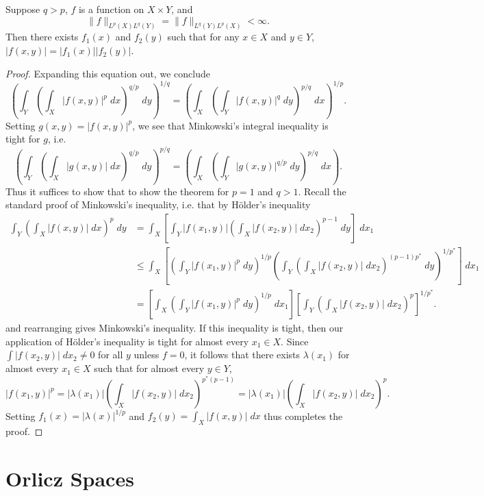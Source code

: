 \begin{theorem}
  Suppose $q > p$, $f$ is a function on $X \times Y$, and
  \[ \| f \|_{L^p(X) L^q(Y)} = \| f \|_{L^q(Y) L^p(X)} < \infty. \]
  Then there exists $f_1(x)$ and $f_2(y)$ such that for any $x \in X$ and $y \in Y$, $|f(x,y)| = |f_1(x)| |f_2(y)|$.
\end{theorem}
\begin{proof}
  Expanding this equation out, we conclude
  \[ \left( \int_Y \left( \int_X |f(x,y)|^p\; dx \right)^{q/p}\; dy \right)^{1/q} = \left( \int_X \left( \int_Y |f(x,y)|^q\; dy \right)^{p/q}\; dx \right)^{1/p}. \]
  Setting $g(x,y) = |f(x,y)|^p$, we see that Minkowski's integral inequality is tight for $g$, i.e.
  \[ \left( \int_Y \left( \int_X |g(x,y)|\; dx \right)^{q/p}\; dy \right)^{p/q} = \left( \int_X \left( \int_Y |g(x,y)|^{q/p}\; dy \right)^{p/q}\; dx \right). \]
  Thus it suffices to show that to show the theorem for $p = 1$ and $q > 1$. Recall the standard proof of Minkowski's inequality, i.e. that by H\"{o}lder's inequality
  \begin{align*}
    \int_Y \left( \int_X |f(x,y)|\; dx \right)^p\; dy &= \int_X \left[ \int_Y |f(x_1,y)| \left( \int_X |f(x_2,y)|\; dx_2 \right)^{p-1}\; dy \right]\; dx_1\\
    &\leq \int_X \left[ \left( \int_Y |f(x_1,y)|^p\; dy \right)^{1/p} \left( \int_Y \left( \int_X |f(x_2,y)|\; dx_2 \right)^{(p-1)p^*}\; dy \right)^{1/p^*} \right]\; dx_1 \\
    &= \left[ \int_X \left( \int_Y |f(x_1,y)|^p\; dy \right)^{1/p}\; dx_1 \right] \left[ \int_Y \left( \int_X |f(x_2,y)|\; dx_2 \right)^p \right]^{1/p^*}.
  \end{align*}
  and rearranging gives Minkowski's inequality. If this inequality is tight, then our application of H\"{o}lder's inequality is tight for almost every $x_1 \in X$. Since $\int |f(x_2,y)|\; dx_2 \neq 0$ for all $y$ unless $f = 0$, it follows that there exists $\lambda(x_1)$ for almost every $x_1 \in X$ such that for almost every $y \in Y$,
  \[ |f(x_1,y)|^p = |\lambda(x_1)| \left( \int_X |f(x_2,y)|\; dx_2 \right)^{p^*(p-1)} = |\lambda(x_1)| \left( \int_X |f(x_2,y)|\; dx_2 \right)^p. \]
  Setting $f_1(x) = |\lambda(x)|^{1/p}$ and $f_2(y) = \int_X |f(x,y)|\; dx$ thus completes the proof.
\end{proof}

\section{Orlicz Spaces}


